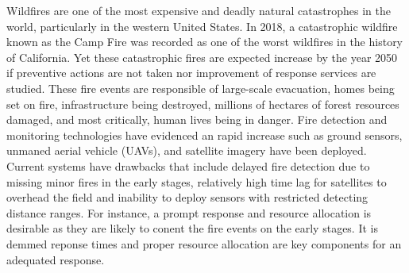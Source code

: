 \documentclass[preprint,review, 11pt,3p,authoryear]{elsarticle}
\begin{document}
Wildfires are one of the most expensive and deadly natural catastrophes in the world, particularly in the western United States. In 2018, a catastrophic wildfire known as the Camp Fire was recorded as one of the worst wildfires in the history of California. 
Yet these catastrophic fires are expected increase by the year 2050 \cite{united_nations} if preventive actions are not taken nor improvement of response services are studied. 
These fire events are responsible of large-scale evacuation, homes being set on fire, infrastructure being destroyed, millions of hectares of forest resources damaged, and most critically, human lives being in danger.
Fire detection and monitoring technologies have evidenced an rapid increase such as ground sensors, unmaned aerial vehicle (UAVs), and satellite imagery have been deployed.
Current systems have drawbacks that include delayed fire detection due to missing minor fires in the early stages, relatively high time lag for satellites to overhead the 
field and inability to deploy sensors with restricted detecting distance ranges. For instance, a prompt response and resource allocation is desirable as they are likely to conent the fire events on the early stages. 
It is demmed reponse times and proper resource allocation are key components for an adequated response.
\end{document}
